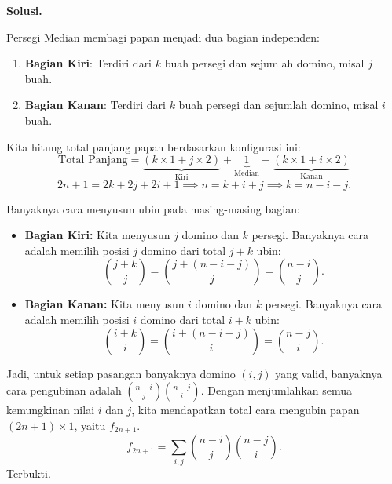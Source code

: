 \documentclass[12pt,twoside]{article}
\newenvironment{solution}
{
	\par\noindent\textbf{\underline{Solusi.}}\\
}
{
	\par
}
\begin{document}
\begin{enumerate}
\begin{solution}
          \begin{center}
          \end{center}

          Persegi Median membagi papan menjadi dua bagian independen:
          \begin{enumerate}
            \item \textbf{Bagian Kiri}: Terdiri dari $k$ buah persegi dan sejumlah domino, misal $j$ buah.
            \item \textbf{Bagian Kanan}: Terdiri dari $k$ buah persegi dan sejumlah domino, misal $i$ buah.
          \end{enumerate}

          Kita hitung total panjang papan berdasarkan konfigurasi ini:
          \[ \text{Total Panjang} = \underbrace{(k \times 1 + j \times 2)}_{\text{Kiri}} + \underbrace{1}_{\text{Median}} + \underbrace{(k \times 1 + i \times 2)}_{\text{Kanan}} \]
          \[ 2n+1 = 2k + 2j + 2i + 1 \implies n = k + i + j \implies k = n - i - j. \]

          Banyaknya cara menyusun ubin pada masing-masing bagian:
          \begin{itemize}
            \item \textbf{Bagian Kiri:} Kita menyusun $j$ domino dan $k$ persegi. Banyaknya cara adalah memilih posisi $j$ domino dari total $j+k$ ubin:
                  \[ \binom{j+k}{j} = \binom{j+(n-i-j)}{j} = \binom{n-i}{j}. \]
            \item \textbf{Bagian Kanan:} Kita menyusun $i$ domino dan $k$ persegi. Banyaknya cara adalah memilih posisi $i$ domino dari total $i+k$ ubin:
                  \[ \binom{i+k}{i} = \binom{i+(n-i-j)}{i} = \binom{n-j}{i}. \]
          \end{itemize}

          Jadi, untuk setiap pasangan banyaknya domino $(i, j)$ yang valid, banyaknya cara pengubinan adalah $\binom{n-i}{j}\binom{n-j}{i}$.
          Dengan menjumlahkan semua kemungkinan nilai $i$ dan $j$, kita mendapatkan total cara mengubin papan $(2n+1)\times 1$, yaitu $f_{2n+1}$.
          \[ f_{2n+1} = \sum_{i,j} \binom{n-i}{j}\binom{n-j}{i}. \]
          Terbukti.
        \end{solution}
\end{enumerate}
\end{document}
